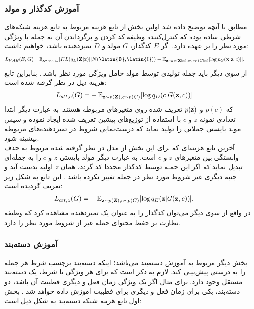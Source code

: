 \subsubsection*{آموزش کدگذار و مولد}
مطابق با آنچه توضیح داده شد اولین بخش از تابع هزینه مربوط به تابع هزینه شبکه‌های \vae{} شرطی ساده بوده که کنترل‌کننده وظیفه کد کردن و برگرداندن آن به جمله با ویژگی مورد نظر را بر عهده دارد. اگر $E$ کدگذار، $G$ مولد و $D$ تمیزدهنده باشد، خواهیم داشت:
\begin{equation}
	\begin{split}
		L_{VAE} (E, G) =& \expected_{\bff{x} \sim p_{data}} [KL (q_E(\bff{Z}|\bff{x}) || N(\textbf{\latin{0}},\textbf{\latin{I}})) - \expected_{\bff{z} \sim q_E(\bff{Z}|\bff{x}), c \sim q_D(C|\bff{x})} [\log p_G(\bff{x}|\bff{z},c)]].
	\end{split}
\end{equation}
از سوی دیگر باید جمله تولیدی توسط مولد حامل ویژگی مورد نظر باشد \cite{toward}. بنابراین تابع هزینه ذیل در نظر گرفته شده است:
\begin{equation}
	\begin{split}
		L_{att, c} (G) =& -\mathbb E_{{\bf z} \sim p({\bf Z}), c \sim p(C)} [\log q_D(c|G({\bf z}, c))]
	\end{split}
\end{equation}
که $p(c)$ و $p({\bf z})$
تعریف شده روی متغیرهای مربوطه هستند. به عبارت دیگر ابتدا تعدادی نمونه $z$ و $c$ با استفاده از توزیع‌های پیشین تعریف شده ایجاد نموده و سپس مولد بایستی جملاتی را تولید نماید که درست‌نمایی شروط در تمیزدهنده‌های مربوطه بیشینه شود.\\
آخرین تابع هزینه‌ای که برای این بخش از مدل در نظر گرفته شده مربوط به حذف وابستگی بین متغیرهای $z$ و $c$ است. به عبارت دیگر مولد بایستی $z$ و $c$ را به جمله‌ای تبدیل نماید که اگر این جمله توسط کدگذار مجددا کد گردد، همان $z$ اولیه بدست آید و جنبه دیگری غیر شروط مورد نظر در جمله تغییر نکرده باشد \cite{toward}. این تابع به شکل زیر تعریف گردیده است:
\begin{equation}
	\begin{split}
		L_{att, z} (G) =& -\mathbb E_{{\bf z} \sim p({\bf Z}), c \sim p(C)} [\log q_E({\bf z}|G({\bf z}, c))].
	\end{split}
\end{equation}
در واقع از سوی دیگر می‌توان کدگذار را به عنوان یک تمیزدهنده‌ مشاهده کرد که وظیفه نظارت بر حفظ محتوای جمله غیر از شروط مورد نظر را دارد.
\subsubsection*{آموزش دسته‌بند}
بخش دیگر مربوط به آموزش دسته‌بند می‌باشد؛ اینکه دسته‌بند برچسب شرط هر جمله را به درستی پیش‌بینی کند. لازم به ذکر است که برای هر ویژگی یا شرط، یک دسته‌بند مستقل وجود دارد. برای مثال اگر یک ویژگی زمان فعل و دیگری قطبیت آن باشد، دو دسته‌بند، یکی برای زمان فعل و دیگری برای قطبیت آموزش داده خواهد شد \cite{toward}. بخش اول تابع هزینه شبکه دسته‌بند به شکل ذیل است:

